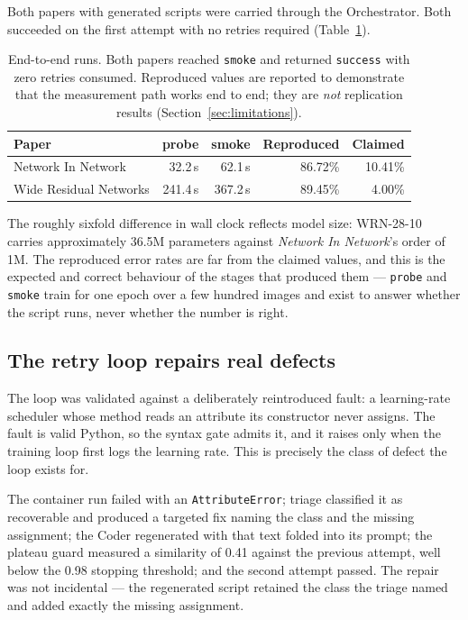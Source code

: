 \documentclass[11pt]{article}
\begin{document}
Both papers with generated scripts were carried through the Orchestrator. Both succeeded
on the first attempt with no retries required (Table~\ref{tab:runs}).

\begin{table}[htbp]
\centering
\small
\caption{End-to-end runs. Both papers reached \texttt{smoke} and returned
\texttt{success} with zero retries consumed. Reproduced values are reported to
demonstrate that the measurement path works end to end; they are \emph{not}
replication results (Section~\ref{sec:limitations}).}
\label{tab:runs}
\begin{tabular}{lrrrr}
\toprule
Paper & probe & smoke & Reproduced & Claimed \\
\midrule
Network In Network     &  32.2\,s &  62.1\,s & 86.72\% & 10.41\% \\
Wide Residual Networks & 241.4\,s & 367.2\,s & 89.45\% &  4.00\% \\
\bottomrule
\end{tabular}
\end{table}

The roughly sixfold difference in wall clock reflects model size: WRN-28-10 carries
approximately 36.5M parameters against \emph{Network In Network}'s order of 1M. The
reproduced error rates are far from the claimed values, and this is the expected and
correct behaviour of the stages that produced them --- \texttt{probe} and \texttt{smoke}
train for one epoch over a few hundred images and exist to answer whether the script
runs, never whether the number is right.

\subsection{The retry loop repairs real defects}

The loop was validated against a deliberately reintroduced fault: a learning-rate
scheduler whose method reads an attribute its constructor never assigns. The fault is
valid Python, so the syntax gate admits it, and it raises only when the training loop
first logs the learning rate. This is precisely the class of defect the loop exists for.

The container run failed with an \texttt{AttributeError}; triage classified it as
recoverable and produced a targeted fix naming the class and the missing assignment; the
Coder regenerated with that text folded into its prompt; the plateau guard measured a
similarity of 0.41 against the previous attempt, well below the 0.98 stopping threshold;
and the second attempt passed. The repair was not incidental --- the regenerated script
retained the class the triage named and added exactly the missing assignment.
\end{document}
